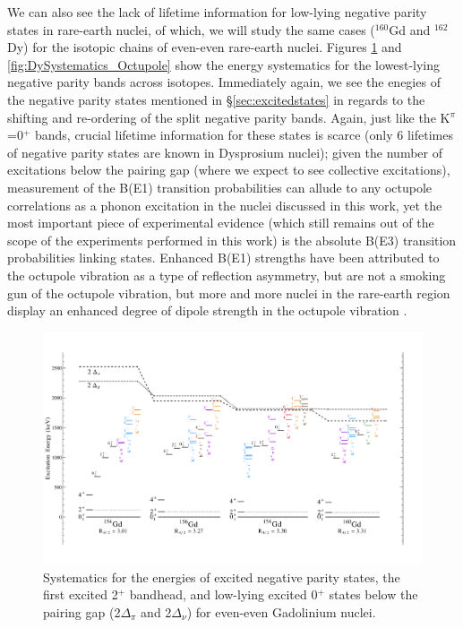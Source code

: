 We can also see the lack of lifetime information for low-lying negative parity states in rare-earth nuclei, of which, we will study the same cases ($^{160}$Gd and $^{162}$Dy) for the isotopic chains of even-even rare-earth nuclei. Figures \ref{fig:GdSystematics_Octupole} and \ref{fig:DySystematics_Octupole} show the energy systematics for the lowest-lying negative parity bands across isotopes. Immediately again, we see the enegies of the negative parity states mentioned in \S \ref{sec:excitedstates} in regards to the shifting and re-ordering of the split negative parity bands. Again, just like the K$^\pi$=0$^+$ bands, crucial lifetime information for these states is scarce (only 6 lifetimes of negative parity states are known in Dysprosium nuclei); given the number of excitations below the pairing gap (where we expect to see collective excitations), measurement of the B(E1) transition probabilities can allude to any octupole correlations as a phonon excitation in the nuclei discussed in this work, yet the most important piece of experimental evidence (which still remains out of the scope of the experiments performed in this work) is the absolute B(E3) transition probabilities linking states. Enhanced B(E1) strengths have been attributed to the octupole vibration as a type of reflection asymmetry, but are not a smoking gun of the octupole vibration, but more and more nuclei in the rare-earth region display an enhanced degree of dipole strength in the octupole vibration \cite{Soloviev_QuadHex,Pascu_octupole_2015}. 

\begin{landscape}
\begin{figure}[ht] 
\begin{center}
\includegraphics[height=0.8\textheight]{SciDraw_Gd_Octupole_Systematics_FULL.pdf}
\caption{Systematics for the energies of excited negative parity states, the first excited 2$^+$ bandhead, and low-lying excited 0$^+$ states below the pairing gap (2$\Delta_\pi$ and 2$\Delta_\nu$) for even-even Gadolinium nuclei.}
\label{fig:GdSystematics_Octupole}
\end{center}
\end{figure}
\end{landscape}

